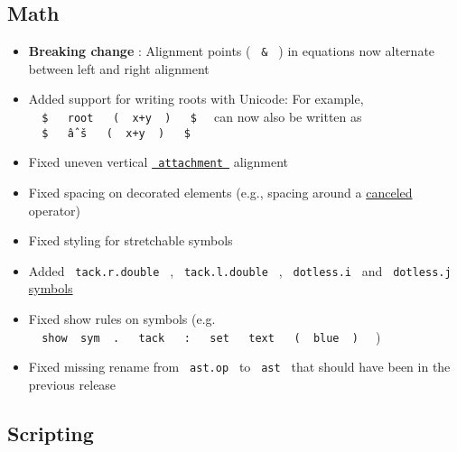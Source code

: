 \subsection{Math}\label{math}

\begin{itemize}
\tightlist
\item
  \textbf{Breaking change} : Alignment points ( \texttt{\ \&\ } ) in
  equations now alternate between left and right alignment
\item
  Added support for writing roots with Unicode: For example,
  \texttt{\ }{\texttt{\ \$\ }}\texttt{\ }{\texttt{\ root\ }}\texttt{\ }{\texttt{\ (\ }}\texttt{\ x+y\ }{\texttt{\ )\ }}\texttt{\ }{\texttt{\ \$\ }}\texttt{\ }
  can now also be written as
  \texttt{\ }{\texttt{\ \$\ }}\texttt{\ }{\texttt{\ âˆš\ }}\texttt{\ }{\texttt{\ (\ }}\texttt{\ x+y\ }{\texttt{\ )\ }}\texttt{\ }{\texttt{\ \$\ }}\texttt{\ }
\item
  Fixed uneven vertical
  \href{/docs/reference/math/attach/\#functions-attach}{\texttt{\ attachment\ }}
  alignment
\item
  Fixed spacing on decorated elements (e.g., spacing around a
  \href{/docs/reference/math/cancel/}{canceled} operator)
\item
  Fixed styling for stretchable symbols
\item
  Added \texttt{\ tack.r.double\ } , \texttt{\ tack.l.double\ } ,
  \texttt{\ dotless.i\ } and \texttt{\ dotless.j\ }
  \href{/docs/reference/symbols/sym/}{symbols}
\item
  Fixed show rules on symbols (e.g.
  \texttt{\ }{\texttt{\ show\ }}\texttt{\ sym\ }{\texttt{\ .\ }}\texttt{\ }{\texttt{\ tack\ }}\texttt{\ }{\texttt{\ :\ }}\texttt{\ }{\texttt{\ set\ }}\texttt{\ }{\texttt{\ text\ }}\texttt{\ }{\texttt{\ (\ }}\texttt{\ blue\ }{\texttt{\ )\ }}\texttt{\ }
  )
\item
  Fixed missing rename from \texttt{\ ast.op\ } to \texttt{\ ast\ } that
  should have been in the previous release
\end{itemize}

\subsection{Scripting}\label{scripting}


